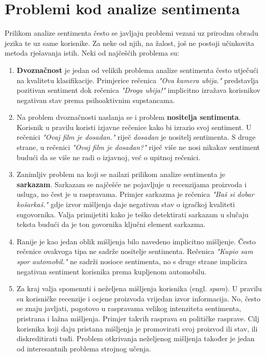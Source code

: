 \documentclass[times, utf8, zavrsni, numeric]{fer}
\begin{document}
\section{Problemi kod analize sentimenta} \label{saprob}
Prilikom analize sentimenta često se javljaju problemi vezani uz prirodnu obradu jezika te uz same korisnike.
Za neke od njih, na žalost, još ne postoji učinkovita metoda rješavanja istih.
Neki od najčešćih problema su:

\begin{enumerate}
  \item \textbf{Dvoznačnost} je jedan od velikih problema analize sentimenta često utječući na kvalitetu 
  klasifikacije.
  Primjerice rečenica \textit{"Ova kamera ubija."} predstavlja pozitivan sentiment dok rečenica
  \textit{"Droga ubija!"} implicitno izražava korisnikov negativan stav prema psihoaktivnim supstancama.

  \item Na problem dvoznačnosti naslanja se i problem \textbf{nositelja sentimenta}. Korisnik u pravilu
  koristi izjavne rečenice kako bi izrazio svoj sentiment. U rečenici \textit{"Ovaj film je dosadan."}
  riječ \textit{dosadan} je nositelj sentimenta.
  S druge strane, u rečenici \textit{"Ovaj film je dosadan?"} riječ više ne nosi nikakav sentiment budući
  da se više ne radi o izjavnoj, već o upitnoj rečenici.

  \item Zanimljiv problem na koji se nailazi prilikom analize sentimenta je \textbf{sarkazam}.
  Sarkazam se najčešće ne pojavljuje u recenzijama proizvoda i usluga, no čest je u raspravama.
  Primjer sarkazma je rečenica \textit{"Baš si dobar košarkaš."} gdje izvor mišljenja daje negativan
  stav o igračkoj kvaliteti sugovornika. Valja primijetiti kako je teško detektirati sarkazam u slučaju
  teksta budući da je ton govornika ključni element sarkazma.

  \item Ranije je kao jedan oblik mišljenja bilo navedeno implicitno mišljenje. Često rečenice ovakvoga
  tipa ne sadrže nositelje sentimenta. Rečenica \textit{"Kupio sam spor automobil."} ne sadrži nosioce
  sentimenta, no s druge strane implicira negativan sentiment korisnika prema kupljenom automobilu.

  \item Za kraj valja spomenuti i neželjena mišljenja korisnika (engl. \textit{spam}).
  U pravilu su korisničke recenzije i ocjene proizvoda vrijedan izvor informacija.
  No, često se znaju javljati, pogotovo u raspravama velikog intenziteta sentimenta, pristrana i lažna
  mišljenja.
  Primjer takvih rasprava su političke rasprave.
  Cilj korisnika koji daju pristana mišljenja je promovirati svoj proizvod ili stav, ili diskreditirati
  tuđi.
  Problem otkrivanja neželjenog mišljenja također je jedan od interesantnih problema strojnog učenja.
\end{enumerate}
\end{document}
